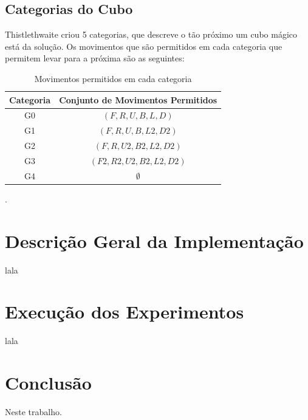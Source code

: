 \documentclass[12pt]{article}
\begin{document}
  \subsection{Categorias do Cubo}
  Thistlethwaite criou 5 categorias, que descreve o tão próximo um cubo mágico está da solução. Os movimentos que são permitidos em cada categoria que permitem levar para a próxima são as seguintes:

  \begin{table}[ht]
      \centering
      \caption{Movimentos permitidos em cada categoria}
      \begin{tabular}{|c|c|}
        \hline
        \textbf{Categoria} & \textbf{Conjunto de Movimentos Permitidos}  \\ \hline
            G0             &  $(F, R, U, B, L, D)$           \\ \hline
            G1             &  $(F, R, U, B, L2, D2)$         \\ \hline
            G2             &  $(F, R, U2, B2, L2, D2)$       \\ \hline
            G3             &  $(F2, R2, U2, B2, L2, D2)$     \\ \hline
            G4             &  $\emptyset$                    \\ \hline
      \end{tabular}
  \end{table}

  \cite{thistlethwaite}.

\section{Descrição Geral da Implementação}
  lala

\section{Execução dos Experimentos}
  lala

\section{Conclusão}
  Neste trabalho.



\end{document}
